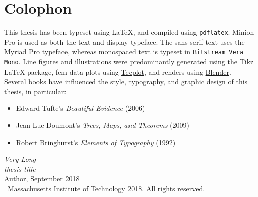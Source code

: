 {%
\thispagestyle{empty}%
\small%
\vfill%
%
\section*{Colophon}
\noindent This thesis has been typeset using \LaTeX{}, and compiled using \texttt{pdflatex}.
Minion Pro is used as both the text and display typeface.
The sans-serif text uses the \textsf{Myriad Pro} typeface, whereas monospaced text is typeset in \texttt{Bitstream Vera Mono}.
Line figures and illustrations were predominantly generated  using the \href{https://ctan.org/pkg/pgf?lang=en}{Tikz} \LaTeX{} package, \acrshort{fem} data plots using \href{https://www.tecplot.com/}{Tecplot}, and renders using \href{https://www.blender.org/}{Blender}.
\mbox{}\vspace{0.5pc}\\
\noindent Several books have influenced the style, typography, and graphic design of this thesis, in particular:
\begin{itemize}
  \item[] Edward Tufte's \textit{Beautiful Evidence} (2006)
  \item[] Jean-Luc Doumont's \textit{Trees, Maps, and Theorems} (2009)
  \item[] Robert Bringhurst's \textit{Elements of Typography} (1992)
\end{itemize}
\vspace{0.75pc}%

\noindent\textit{Very Long }\\
\textit{thesis title}\vspace{0.25pc}\\
Author, September 2018 \vspace{1.25pc}\\
\noindent \textcopyright\ Massachusetts Institute of Technology 2018. All rights reserved.\vspace{1pc} \\
}
